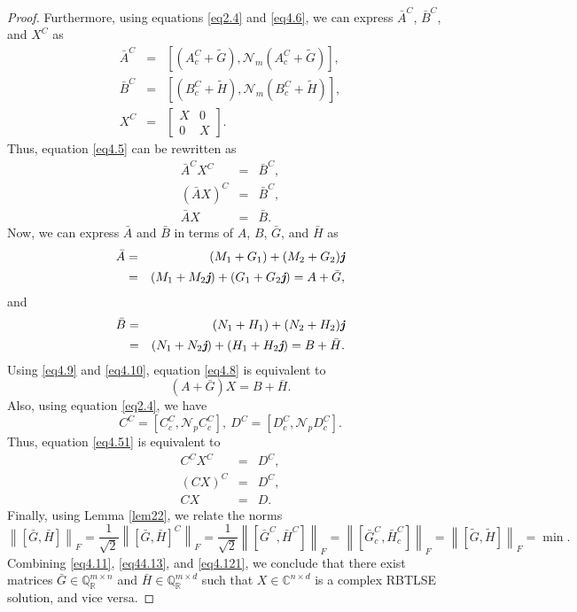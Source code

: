 \documentclass[preprint,11pt,3p]{elsarticle}
\newcommand\norm[1]{\left\lVert#1\right\rVert}
\def \C{{\mathbb C}}
\def \QR{\mathbb{Q}_\mathbb{R}}
\def \j{\textit{\textbf{j}}}
\begin{document}
\begin{proof}
	Furthermore, using equations \eqref{eq2.4} and \eqref{eq4.6}, we can express $\bar{A}^C$, $\bar{B}^C$, and $X^C$ as
	\begin{eqnarray*}
		\bar{A}^C&=& \left[(A^C_c+ \widetilde{G}), \mathcal{N}_m(A^C_c+ \widetilde{G})\right], \\
		\bar{B}^C&=& \left[(B^C_c+\widetilde{H}), \mathcal{N}_m(B^C_c+\widetilde{H})\right],\\
		X^C&=& 
		\begin{bmatrix}
			X & 0  \\
			0 & X 
		\end{bmatrix}.
	\end{eqnarray*}
	Thus, equation \eqref{eq4.5} can be rewritten as
	\begin{eqnarray}
		\bar{A}^C X^C&=& \bar{B}^C, \label{eq4.7}\\
		(\bar{A}X)^C&=& \bar{B}^C, \nonumber\\
		\bar{A}X&=& \bar{B}. \label{eq4.8}
	\end{eqnarray}
	Now, we can express $\bar{A}$ and $\bar{B}$ in terms of $A$, $B$, $\bar{G}$, and $\bar{H}$ as
	\begin{eqnarray}
		\bar{A}&=& (M_{1}+ G_{1})+ (M_{2}+ G_{2})\j \nonumber \\
		&=& (M_1+ M_2\j)+ (G_1+ G_2\j) = A+ \bar{G}, \label{eq4.9}
	\end{eqnarray}
	and
	\begin{eqnarray}
		\bar{B}&=& (N_1+ H_1)+ (N_2+ H_2)\j \nonumber\\
		&=& (N_1+ N_2\j)+ (H_1+ H_2\j) = B+ \bar{H}. \label{eq4.10}
	\end{eqnarray}
	Using \eqref{eq4.9} and \eqref{eq4.10}, equation \eqref{eq4.8} is equivalent to
	\begin{equation} \label{eq4.11}
		(A+\bar{G})X= B+ \bar{H}.
	\end{equation}
Also, using equation \eqref{eq2.4}, we have
	\begin{equation}\label{eq4.12}
		C^C = \left[C^C_c, \mathcal{N}_p C^C_c\right], ~ D^C=\left[D^C_c, \mathcal{N}_p D^C_c\right].
	\end{equation}
	Thus, equation \eqref{eq4.51} is equivalent to
	\begin{eqnarray}
		C^C X^C&=& D^C, \nonumber\\
		(CX)^C&=& D^C, \nonumber\\
		CX&=& D. \label{eq44.13}
	\end{eqnarray}
	Finally, using Lemma \ref{lem22}, we relate the norms
	\begin{equation}\label{eq4.121}
		\norm{[\bar{G}, \bar{H}]}_F= \frac{1}{\sqrt{2}} \norm{[\bar{G}, \bar{H}]^C}_F= \frac{1}{\sqrt{2}} \norm{[\bar{G}^C, \bar{H}^C]}_F= \norm{[\bar{G}^C_c, \bar{H}^C_c]}_F= \norm{[\widetilde{G}, \widetilde{H}]}_F= \min.  
	\end{equation}
	Combining \eqref{eq4.11}, \eqref{eq44.13}, and \eqref{eq4.121}, we conclude that there exist matrices $\bar{G} \in \QR^{m \times n}$ and $\bar{H} \in \QR^{m \times d}$ such that
	$X  \in  \C^{n \times d}$ is a complex RBTLSE solution, and vice versa.
\end{proof}
\end{document}
